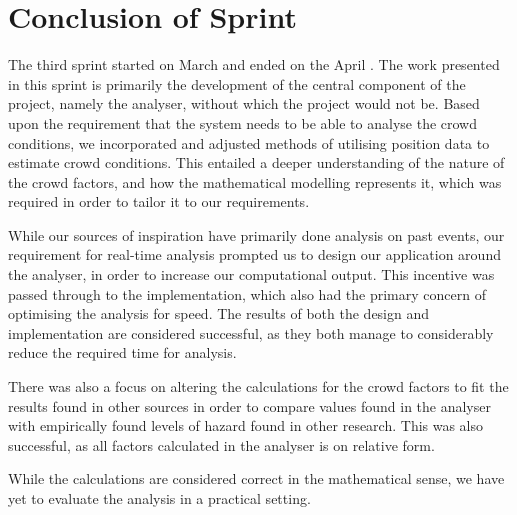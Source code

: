 \section{Conclusion of Sprint}
The third sprint started on March  and ended on the April . The work presented in this sprint is primarily the development of the central component of the project, namely the analyser, without which the project would not be. Based upon the requirement that the system needs to be able to analyse the crowd conditions, we incorporated and adjusted methods of utilising position data to estimate crowd conditions. This entailed a deeper understanding of the nature of the crowd factors, and how the mathematical modelling represents it, which was required in order to tailor it to our requirements.

While our sources of inspiration have primarily done analysis on past events, our requirement for real-time analysis prompted us to design our application around the analyser, in order to increase our computational output. This incentive was passed through to the implementation, which also had the primary concern of optimising the analysis for speed. The results of both the design and implementation are considered successful, as they both manage to considerably reduce the required time for analysis.

There was also a focus on altering the calculations for the crowd factors to fit the results found in other sources in order to compare values found in the analyser with empirically found levels of hazard found in other research. This was also successful, as all factors calculated in the analyser is on relative form.

While the calculations are considered correct in the mathematical sense, we have yet to evaluate the analysis in a practical setting.
